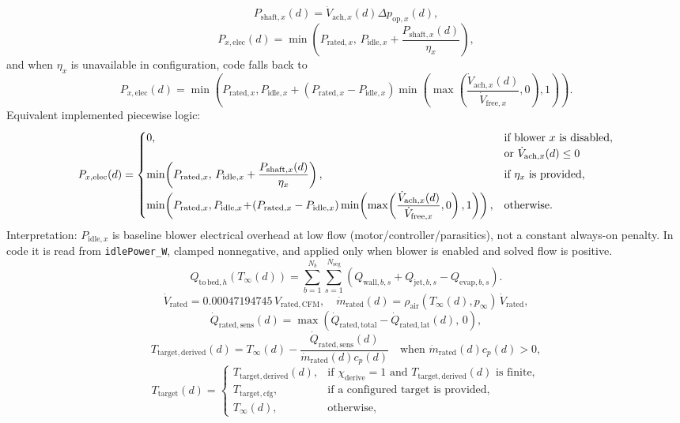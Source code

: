 \documentclass[11pt]{article}
\begin{document}
\[
P_{\mathrm{shaft},x}(d)=\dot V_{\mathrm{ach},x}(d)\Delta p_{\mathrm{op},x}(d),
\]
\[
P_{x,\mathrm{elec}}(d)=\min\!\left(P_{\mathrm{rated},x},\,P_{\mathrm{idle},x}+\frac{P_{\mathrm{shaft},x}(d)}{\eta_x}\right),
\]
and when \(\eta_x\) is unavailable in configuration, code falls back to
\[
P_{x,\mathrm{elec}}(d)=\min\!\left(
P_{\mathrm{rated},x},
P_{\mathrm{idle},x}
\!+\!
\left(P_{\mathrm{rated},x}-P_{\mathrm{idle},x}\right)
\min\!\left(\max\!\left(\frac{\dot V_{\mathrm{ach},x}(d)}{\dot V_{\mathrm{free},x}},0\right),1\right)
\right).
\]
Equivalent implemented piecewise logic:
\[
P_{x,\mathrm{elec}}(d)=
\begin{cases}
0, & \begin{array}[t]{@{}l@{}}\text{if blower \(x\) is disabled}\\\text{or }\dot V_{\mathrm{ach},x}(d)\le 0\end{array},\\[4pt]
\min\!\left(P_{\mathrm{rated},x},\,P_{\mathrm{idle},x}+\dfrac{P_{\mathrm{shaft},x}(d)}{\eta_x}\right), &
\text{if }\eta_x\text{ is provided},\\[8pt]
\min\!\left(
P_{\mathrm{rated},x},
P_{\mathrm{idle},x}
\!+\!
\left(P_{\mathrm{rated},x}-P_{\mathrm{idle},x}\right)
\min\!\left(\max\!\left(\dfrac{\dot V_{\mathrm{ach},x}(d)}{\dot V_{\mathrm{free},x}},0\right),1\right)
\right), &
\text{otherwise}.
\end{cases}
\]
Interpretation: \(P_{\mathrm{idle},x}\) is baseline blower electrical overhead at low flow (motor/controller/parasitics), not a constant always-on penalty. In code it is read from \texttt{idlePower\_W}, clamped nonnegative, and applied only when blower is enabled and solved flow is positive.
\[
Q_{\mathrm{to\,bed},h}(T_\infty(d))=
\sum_{b=1}^{N_b}\sum_{s=1}^{N_{\mathrm{seg}}}
\left(Q_{\mathrm{wall},b,s}+Q_{\mathrm{jet},b,s}-Q_{\mathrm{evap},b,s}\right).
\]
\[
\dot V_{\mathrm{rated}}=0.00047194745\,V_{\mathrm{rated,CFM}},\quad
\dot m_{\mathrm{rated}}(d)=\rho_{\mathrm{air}}(T_\infty(d),p_\infty)\,\dot V_{\mathrm{rated}},
\]
\[
\dot Q_{\mathrm{rated,sens}}(d)=\max\!\left(\dot Q_{\mathrm{rated,total}}-\dot Q_{\mathrm{rated,lat}}(d),\,0\right),
\]
\[
T_{\mathrm{target,derived}}(d)=
T_\infty(d)-\frac{\dot Q_{\mathrm{rated,sens}}(d)}{\dot m_{\mathrm{rated}}(d)c_p(d)}
\quad\text{when }\dot m_{\mathrm{rated}}(d)c_p(d)>0,
\]
\[
T_{\mathrm{target}}(d)=
\begin{cases}
T_{\mathrm{target,derived}}(d), & \text{if }\chi_{\mathrm{derive}}=1\text{ and }T_{\mathrm{target,derived}}(d)\text{ is finite},\\
T_{\mathrm{target,cfg}}, & \text{if a configured target is provided},\\
T_\infty(d), & \text{otherwise},
\end{cases}
\]
\end{document}
